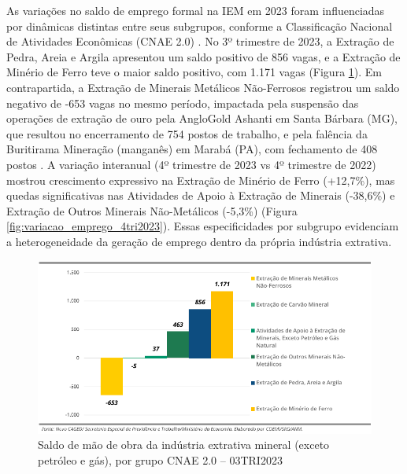 As variações no saldo de emprego formal na IEM em 2023 foram influenciadas por dinâmicas distintas entre seus subgrupos, conforme a Classificação Nacional de Atividades Econômicas (CNAE 2.0) \cite{anm2023c,anm2023d}. No 3º trimestre de 2023, a Extração de Pedra, Areia e Argila apresentou um saldo positivo de 856 vagas, e a Extração de Minério de Ferro teve o maior saldo positivo, com 1.171 vagas (Figura \ref{fig:saldo_mao_obra_3tri2023}). Em contrapartida, a Extração de Minerais Metálicos Não-Ferrosos registrou um saldo negativo de -653 vagas no mesmo período, impactada pela suspensão das operações de extração de ouro pela AngloGold Ashanti em Santa Bárbara (MG), que resultou no encerramento de 754 postos de trabalho, e pela falência da Buritirama Mineração (manganês) em Marabá (PA), com fechamento de 408 postos \cite{anm2023c}. A variação interanual (4º trimestre de 2023 vs 4º trimestre de 2022) mostrou crescimento expressivo na Extração de Minério de Ferro (+12,7\%), mas quedas significativas nas Atividades de Apoio à Extração de Minerais (-38,6\%) e Extração de Outros Minerais Não-Metálicos (-5,3\%) (Figura \ref{fig:variacao_emprego_4tri2023}). Essas especificidades por subgrupo evidenciam a heterogeneidade da geração de emprego dentro da própria indústria extrativa.

\begin{figure}[!htb]
    \centering
    \includegraphics[width=\textwidth]{figures/image6_saldo_mao_obra_3tri2023.png}
    \caption{Saldo de mão de obra da indústria extrativa mineral (exceto petróleo e gás), por grupo CNAE 2.0 -- 03TRI2023}
    \label{fig:saldo_mao_obra_3tri2023}
\end{figure}

